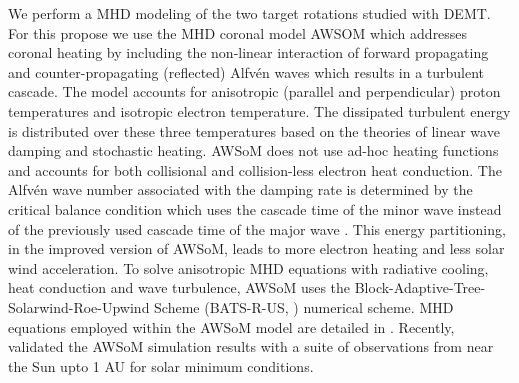 \documentclass[namedreferences]{solarphysics}
\newcommand{\mrsun}{{\rm R_\odot}}
\def\diego#1{\textcolor{red}{#1}}
\begin{document}
\begin{article}


We perform a MHD modeling of the two target rotations studied with DEMT. For this propose we use the MHD coronal model AWSOM which addresses coronal heating by including the non-linear interaction of forward propagating and counter-propagating (reflected) Alfv\'{e}n waves which results in a turbulent cascade.
The model accounts for anisotropic (parallel and perpendicular) proton temperatures and isotropic electron temperature. The dissipated turbulent energy is distributed over these three temperatures based on the theories of linear wave damping and stochastic heating. AWSoM does not use ad-hoc heating functions and accounts for both collisional and collision-less electron heat conduction. The Alfv\'{e}n wave number associated with the damping rate is determined by the critical balance condition which uses the cascade time of the minor wave \citep{Lit2007} instead of the previously used cascade time of the major wave \citep{Cha2011, Van2014}. This energy partitioning, in the improved version of AWSoM, leads to more electron heating and less solar wind acceleration.%
To solve anisotropic MHD equations with radiative cooling, heat conduction and wave turbulence, AWSoM uses the Block-Adaptive-Tree-Solarwind-Roe-Upwind Scheme (BATS-R-US, \citealp{Pow1999, Tot2012}) numerical scheme. MHD equations employed within the AWSoM model are detailed in \citet{Van2014}. Recently, \citet{sachdeva_2019} validated the AWSoM simulation results with a suite of observations from near the Sun upto 1 AU for solar minimum conditions.


\end{article}
\end{document}
